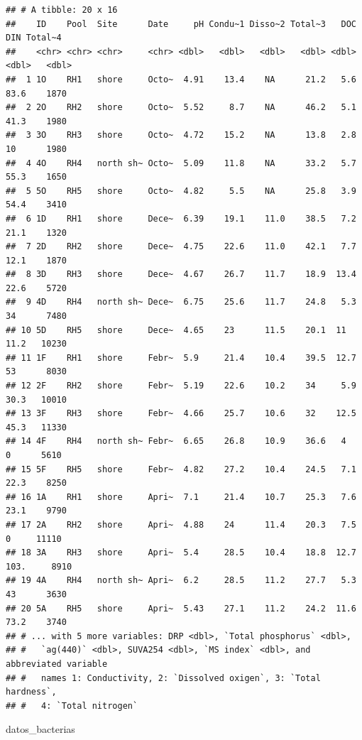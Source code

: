 \documentclass[
]{book}
\newenvironment{Shaded}{\begin{snugshade}}{\end{snugshade}}
\newcommand{\NormalTok}[1]{#1}
\begin{document}
\begin{verbatim}
## # A tibble: 20 x 16
##    ID    Pool  Site      Date     pH Condu~1 Disso~2 Total~3   DOC   DIN Total~4
##    <chr> <chr> <chr>     <chr> <dbl>   <dbl>   <dbl>   <dbl> <dbl> <dbl>   <dbl>
##  1 1O    RH1   shore     Octo~  4.91    13.4    NA      21.2   5.6  83.6    1870
##  2 2O    RH2   shore     Octo~  5.52     8.7    NA      46.2   5.1  41.3    1980
##  3 3O    RH3   shore     Octo~  4.72    15.2    NA      13.8   2.8  10      1980
##  4 4O    RH4   north sh~ Octo~  5.09    11.8    NA      33.2   5.7  55.3    1650
##  5 5O    RH5   shore     Octo~  4.82     5.5    NA      25.8   3.9  54.4    3410
##  6 1D    RH1   shore     Dece~  6.39    19.1    11.0    38.5   7.2  21.1    1320
##  7 2D    RH2   shore     Dece~  4.75    22.6    11.0    42.1   7.7  12.1    1870
##  8 3D    RH3   shore     Dece~  4.67    26.7    11.7    18.9  13.4  22.6    5720
##  9 4D    RH4   north sh~ Dece~  6.75    25.6    11.7    24.8   5.3  34      7480
## 10 5D    RH5   shore     Dece~  4.65    23      11.5    20.1  11    11.2   10230
## 11 1F    RH1   shore     Febr~  5.9     21.4    10.4    39.5  12.7  53      8030
## 12 2F    RH2   shore     Febr~  5.19    22.6    10.2    34     5.9  30.3   10010
## 13 3F    RH3   shore     Febr~  4.66    25.7    10.6    32    12.5  45.3   11330
## 14 4F    RH4   north sh~ Febr~  6.65    26.8    10.9    36.6   4     0      5610
## 15 5F    RH5   shore     Febr~  4.82    27.2    10.4    24.5   7.1  22.3    8250
## 16 1A    RH1   shore     Apri~  7.1     21.4    10.7    25.3   7.6  23.1    9790
## 17 2A    RH2   shore     Apri~  4.88    24      11.4    20.3   7.5   0     11110
## 18 3A    RH3   shore     Apri~  5.4     28.5    10.4    18.8  12.7 103.     8910
## 19 4A    RH4   north sh~ Apri~  6.2     28.5    11.2    27.7   5.3  43      3630
## 20 5A    RH5   shore     Apri~  5.43    27.1    11.2    24.2  11.6  73.2    3740
## # ... with 5 more variables: DRP <dbl>, `Total phosphorus` <dbl>,
## #   `ag(440)` <dbl>, SUVA254 <dbl>, `MS index` <dbl>, and abbreviated variable
## #   names 1: Conductivity, 2: `Dissolved oxigen`, 3: `Total hardness`,
## #   4: `Total nitrogen`
\end{verbatim}

\begin{Shaded}
\begin{Highlighting}[]
\NormalTok{datos\_bacterias}
\end{Highlighting}
\end{Shaded}
\end{document}

